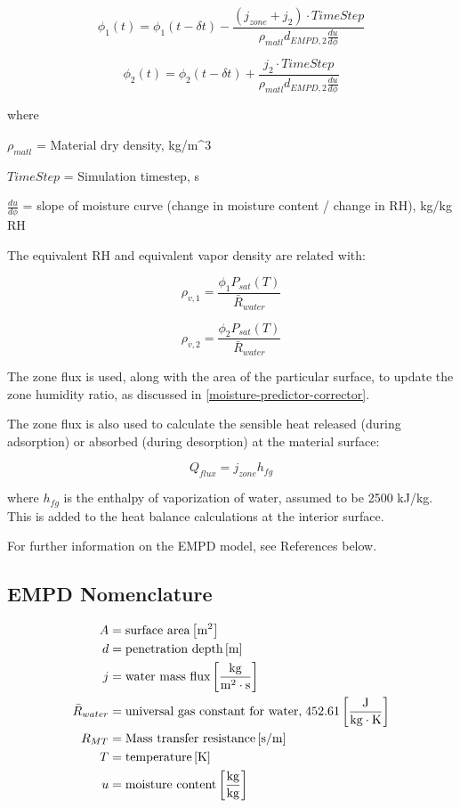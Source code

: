 {\begin{equation}
\phi_{1}(t) = \phi_{1}(t-\delta t) - \frac { (j_{zone} + j_{2}) \cdot TimeStep} {\rho_{matl} d_{EMPD,2} \frac {du}{d\phi}}
\end{equation}

\begin{equation}
\phi_{2}(t) = \phi_{2}(t-\delta t) + \frac { j_{2} \cdot TimeStep} {\rho_{matl} d_{EMPD,2} \frac {du}{d\phi}}
\end{equation}

where

\(\rho_{matl}\) = Material dry density, kg/m^3

\(TimeStep\) = Simulation timestep, s

\(\frac {du}{d\phi}\) = slope of moisture curve (change in moisture content / change in RH), kg/kg \cdot RH

The equivalent RH and equivalent vapor density are related with:

\begin{equation}
\rho_{v,1} = \frac {\phi_{1} P_{sat}(T)} {\bar R_{water}}
\end{equation}

\begin{equation}
\rho_{v,2} = \frac {\phi_{2} P_{sat}(T)} {\bar R_{water}}
\end{equation}

The zone flux is used, along with the area of the particular surface, to update the zone humidity ratio, as discussed in \ref{moisture-predictor-corrector}.

The zone flux is also used to calculate the sensible heat released (during adsorption) or absorbed (during desorption) at the material surface:

\begin{equation}
Q_{flux} = j_{zone} h_{fg}
\end{equation}

where \(h_{fg}\) is the enthalpy of vaporization of water, assumed to be 2500 kJ/kg. This is added to the heat balance calculations at the interior surface.

For further information on the EMPD model, see References below.

\subsection{EMPD Nomenclature}\label{empd-nomenclature}
\begin{align*}  
  A  &= \text{surface area} \bracketunits{m^{2}} \\
  d &= \text{penetration depth} \bracketunits{m} \\
  j &= \text{water mass flux} \bracketunits{\frac{kg}{m^{2} \cdot s}} \\
  \bar R_{water} &= \text{universal gas constant for water,} \; 452.61 \bracketunits{\frac{J}{kg \cdot K}}   \\
  R_{MT} &= \text{Mass transfer resistance} \bracketunits{s/m} \\
  T &= \text{temperature} \bracketunits{K} \\
  u &= \text{moisture content} \bracketunits{\frac{kg}{kg}}
\end{align*}

}
